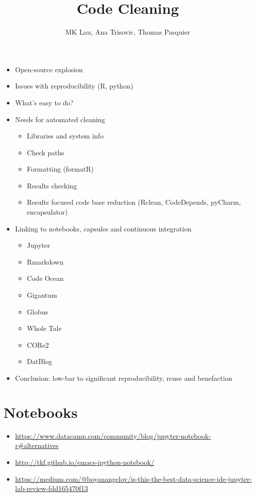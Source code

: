 \documentclass{article}
\title{Code Cleaning}
\author{MK Lau, Ana Trisovic, Thomas Pasquier}
\begin{document}
\maketitle

\begin{itemize}
\item Open-source explosion
\item Issues with reproducibility (R, python)
\item What's easy to do?
\item Needs for automated cleaning
  \begin{itemize}
  \item Libraries and system info
  \item Check paths
  \item Formatting (formatR)
  \item Results checking
  \item Results focused code base reduction (Rclean, CodeDepends,
    pyCharm, encapsulator)
  \end{itemize}
\item Linking to notebooks, capsules and continuous integration
  \begin{itemize}
  \item Jupyter
  \item Rmarkdown
  \item Code Ocean
  \item Gigantum
  \item Globus
  \item Whole Tale
  \item CORe2
  \item DatBlog
  \end{itemize}
\item Conclusion: low-bar to significant reproducibility, reuse and benefaction
\end{itemize}

\section*{Notebooks}

\begin{itemize}
\item \url{https://www.datacamp.com/community/blog/jupyter-notebook-r#alternatives}
\item \url{http://tkf.github.io/emacs-ipython-notebook/}
\item
  \url{https://medium.com/@boyanangelov/is-this-the-best-data-science-ide-jupyter-lab-review-fdd165470f13}
\end{itemize}
\end{document}
